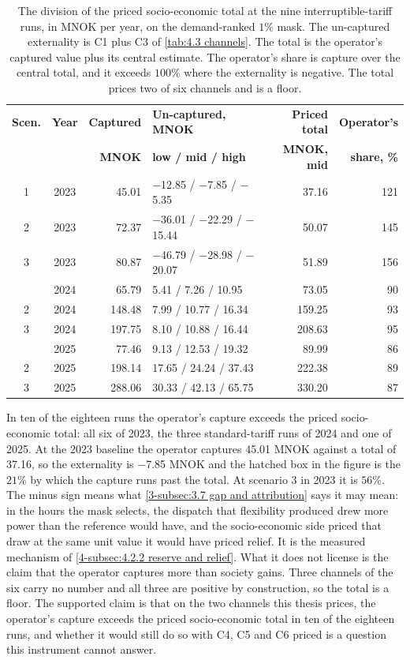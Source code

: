 \begin{table}[htbp]
\centering
\caption{The division of the priced socio-economic total at the nine interruptible-tariff runs, in MNOK per year, on the demand-ranked $1\%$ mask. The un-captured externality is C1 plus C3 of \autoref{tab:4.3 channels}. The total is the operator's captured value plus its central estimate. The operator's share is capture over the central total, and it exceeds $100\%$ where the externality is negative. The total prices two of six channels and is a floor.}
\small
\begin{tabular}{c c r l r r}
\toprule
\textbf{Scen.} & \textbf{Year} & \textbf{Captured} & \textbf{Un-captured, MNOK} & \textbf{Priced total} & \textbf{Operator's} \\
 & & \textbf{MNOK} & \textbf{low / mid / high} & \textbf{MNOK, mid} & \textbf{share, \%} \\
\midrule
1 & 2023 & 45.01 & $-$12.85 / $-$7.85 / $-$5.35 & 37.16 & 121 \\
2 & 2023 & 72.37 & $-$36.01 / $-$22.29 / $-$15.44 & 50.07 & 145 \\
3 & 2023 & 80.87 & $-$46.79 / $-$28.98 / $-$20.07 & 51.89 & 156 \\
\addlinespace
1 & 2024 & 65.79 & 5.41 / 7.26 / 10.95 & 73.05 & 90 \\
2 & 2024 & 148.48 & 7.99 / 10.77 / 16.34 & 159.25 & 93 \\
3 & 2024 & 197.75 & 8.10 / 10.88 / 16.44 & 208.63 & 95 \\
\addlinespace
1 & 2025 & 77.46 & 9.13 / 12.53 / 19.32 & 89.99 & 86 \\
2 & 2025 & 198.14 & 17.65 / 24.24 / 37.43 & 222.38 & 89 \\
3 & 2025 & 288.06 & 30.33 / 42.13 / 65.75 & 330.20 & 87 \\
\bottomrule
\end{tabular}
\label{tab:4.4 division}
\end{table}

In ten of the eighteen runs the operator's capture exceeds the priced socio-economic total: all six of 2023, the three standard-tariff runs of 2024 and one of 2025. At the 2023 baseline the operator captures 45.01 MNOK against a total of 37.16, so the externality is $-$7.85 MNOK and the hatched box in the figure is the $21\%$ by which the capture runs past the total. At scenario 3 in 2023 it is $56\%$. The minus sign means what \autoref{3-subsec:3.7 gap and attribution} says it may mean: in the hours the mask selects, the dispatch that flexibility produced drew more power than the reference would have, and the socio-economic side priced that draw at the same unit value it would have priced relief. It is the measured mechanism of \autoref{4-subsec:4.2.2 reserve and relief}. What it does not license is the claim that the operator captures more than society gains. Three channels of the six carry no number and all three are positive by construction, so the total is a floor. The supported claim is that on the two channels this thesis prices, the operator's capture exceeds the priced socio-economic total in ten of the eighteen runs, and whether it would still do so with C4, C5 and C6 priced is a question this instrument cannot answer.

